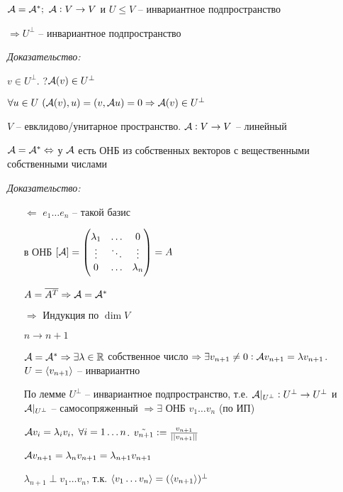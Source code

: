 \documentclass[12pt]{article}
\begin{document}
\begin{lem}{}
    $\mathcal{A} = \mathcal{A}^*;\ \mathcal{A} : V \to V$ и $U \leq V$ -- инвариантное подпространство 

    $\Rightarrow U^\perp$ -- инвариантное подпространство 
\end{lem}

\textit{Доказательство:}

$v \in U^\perp$. ?$\mathcal{A}(v) \in U^\perp$

$\forall u \in U\ (\mathcal{A}(v), u) = (v, \mathcal{A} u) = 0 \Rightarrow \mathcal{A}(v) \in U^\perp$

\begin{theo}{}
    $V$ -- евклидово/унитарное пространство. $\mathcal{A} : V \to V$ -- линейный 

    $\mathcal{A} = \mathcal{A}^* \Leftrightarrow$ у $\mathcal{A}$ есть ОНБ из собственных векторов с вещественными собственными числами 
\end{theo}

\textit{Доказательство:}

\begin{itemize}
    \item[$\Leftarrow$] $e_1 \ldots e_n$ -- такой базис 
    
    в ОНБ $[\mathcal{A}] = \begin{pmatrix}
        \lambda_1 & \ldots & 0 \\
        \vdots & \ddots & \vdots \\
        0 & \ldots & \lambda_n
    \end{pmatrix} = A$

    $A = \overline{A^T} \Rightarrow \mathcal{A} = \mathcal{A}^*$

    \item[$\Rightarrow$] Индукция по $\dim V$
    
    $n \to n + 1$

    $\mathcal{A} = \mathcal{A}^* \Rightarrow \exists \lambda \in \mathbb R$ собственное число $\Rightarrow \exists v_{n + 1} \neq 0 : \mathcal{A} v_{n + 1} = \lambda v_{n + 1}$. $U = \langle v_{n + 1} \rangle$ -- инвариантно 

    По лемме $U^\perp$ -- инвариантное подпространство, т.е. $\mathcal{A}|_{U^\perp} : U^\perp \to U^\perp$ и $\mathcal{A}|_{U^\perp}$ -- самосопряженный $\Rightarrow \exists$ ОНБ $v_1 \ldots v_n$ (по ИП)

    $\mathcal{A} v_i = \lambda_i v_i,\ \forall i = 1 \ldots n$. $\tilde{v_{n + 1}} := \frac{v_{n + 1}}{|| v_{n + 1} ||}$

    $\mathcal{A} v_{n + 1} = \lambda_n v_{n + 1} = \lambda_{n + 1} v_{n + 1}$

    $\lambda_{n + 1} \perp v_1 \ldots v_n$, т.к. $\langle v_1 \ldots v_n \rangle = (\langle v_{n + 1} \rangle)^\perp$
\end{itemize}
\end{document}
